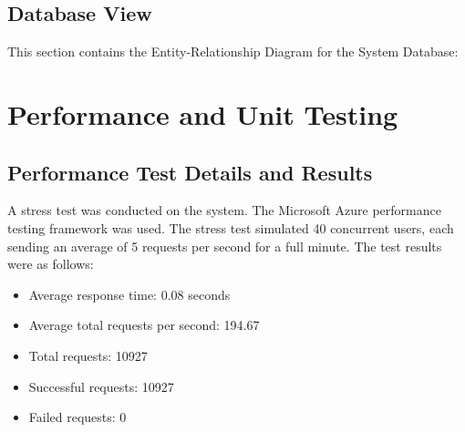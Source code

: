 \documentclass[11pt]{article}
\begin{document}
\subsection{Database View}
This section contains the Entity-Relationship Diagram for the System Database:
\begin{figure}[H]
	
\end{figure}


\section{Performance and Unit Testing}

\subsection{Performance Test Details and Results} 
A stress test was conducted on the system. The Microsoft Azure performance testing framework was used. 
The stress test simulated 40 concurrent users, each sending an average of 5 requests per second for a full minute.
The test results were as follows:
\begin{itemize}
	\item Average response time: 0.08 seconds
	\item Average total requests per second: 194.67
	\item Total requests: 10927
	\item Successful requests: 10927
	\item Failed requests: 0 
\end{itemize}
\end{document}
